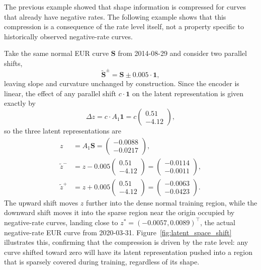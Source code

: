 \begin{example}
The previous example showed that shape information is compressed for curves that 
already have negative rates. The following example shows that this compression is 
a consequence of the rate level itself, not a property specific to historically 
observed negative-rate curves.

Take the same normal EUR curve $\mathbf{S}$ from 2014-08-29 and consider two 
parallel shifts,
$$\tilde{\mathbf{S}}^{\pm} = \mathbf{S} \pm 0.005\cdot\mathbf{1},$$
leaving slope and curvature unchanged by construction. Since the encoder is linear, 
the effect of any parallel shift $c\cdot\mathbf{1}$ on the latent representation 
is given exactly by
$$\Delta z = c \cdot A_1\mathbf{1} = c\begin{pmatrix} 0.51 \\ -4.12 \end{pmatrix},$$
so the three latent representations are
\begin{align*}
z &= A_1\mathbf{S} = \begin{pmatrix} -0.0088 \\ -0.0217 \end{pmatrix}, \\
\tilde{z}^{-} &= z - 0.005\begin{pmatrix} 0.51 \\ -4.12 \end{pmatrix} = 
\begin{pmatrix} -0.0114 \\ -0.0011 \end{pmatrix}, \\
\tilde{z}^{+} &= z + 0.005\begin{pmatrix} 0.51 \\ -4.12 \end{pmatrix} = 
\begin{pmatrix} -0.0063 \\ -0.0423 \end{pmatrix}.
\end{align*}
The upward shift moves $z$ further into the dense normal training region, while 
the downward shift moves it into the sparse region near the origin occupied by 
negative-rate curves, landing close to $z^* = (-0.0057, 0.0089)^\top$, the 
actual negative-rate EUR curve from 2020-03-31. Figure~\ref{fig:latent_space_shift} 
illustrates this, confirming that the compression is driven by the rate level: 
any curve shifted toward zero will have its latent representation pushed into a 
region that is sparsely covered during training, regardless of its shape.


\end{example}
